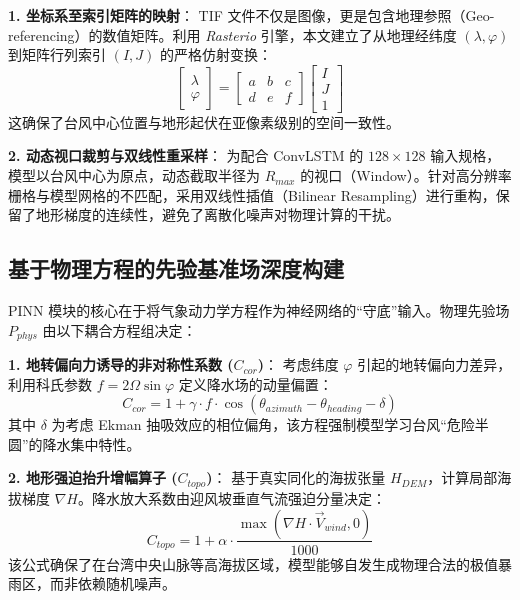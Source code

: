 \documentclass[12pt,a4paper]{ctexart}
\begin{document}
\textbf{1. 坐标系至索引矩阵的映射}：
TIF 文件不仅是图像，更是包含地理参照（Geo-referencing）的数值矩阵。利用 \textit{Rasterio} 引擎，本文建立了从地理经纬度 $(\lambda, \varphi)$ 到矩阵行列索引 $(I, J)$ 的严格仿射变换：
\begin{equation}
    \begin{bmatrix} \lambda \\ \varphi \end{bmatrix} = \begin{bmatrix} a & b & c \\ d & e & f \end{bmatrix} \begin{bmatrix} I \\ J \\ 1 \end{bmatrix}
\end{equation}
这确保了台风中心位置与地形起伏在亚像素级别的空间一致性。

\textbf{2. 动态视口裁剪与双线性重采样}：
为配合 ConvLSTM 的 $128 \times 128$ 输入规格，模型以台风中心为原点，动态截取半径为 $R_{max}$ 的视口（Window）。针对高分辨率栅格与模型网格的不匹配，采用双线性插值（Bilinear Resampling）进行重构，保留了地形梯度的连续性，避免了离散化噪声对物理计算的干扰。

\subsection{基于物理方程的先验基准场深度构建}
PINN 模块的核心在于将气象动力学方程作为神经网络的“守底”输入。物理先验场 $P_{phys}$ 由以下耦合方程组决定：

\textbf{1. 地转偏向力诱导的非对称性系数 ($C_{cor}$)}：
考虑纬度 $\varphi$ 引起的地转偏向力差异，利用科氏参数 $f = 2\Omega \sin \varphi$ 定义降水场的动量偏置：
\begin{equation}
    C_{cor} = 1 + \gamma \cdot f \cdot \cos(\theta_{azimuth} - \theta_{heading} - \delta)
\end{equation}
其中 $\delta$ 为考虑 Ekman 抽吸效应的相位偏角，该方程强制模型学习台风“危险半圆”的降水集中特性。

\textbf{2. 地形强迫抬升增幅算子 ($C_{topo}$)}：
基于真实同化的海拔张量 $H_{DEM}$，计算局部海拔梯度 $\nabla H$。降水放大系数由迎风坡垂直气流强迫分量决定：
\begin{equation}
    C_{topo} = 1 + \alpha \cdot \frac{\max(\nabla H \cdot \vec{V}_{wind}, 0)}{1000}
\end{equation}
该公式确保了在台湾中央山脉等高海拔区域，模型能够自发生成物理合法的极值暴雨区，而非依赖随机噪声。
\end{document}
